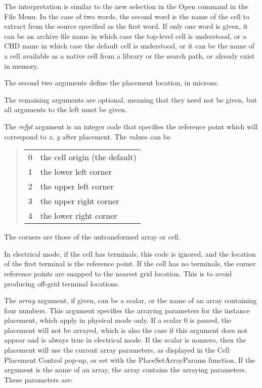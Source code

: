 \begin{description}
The interpretation is similar to the {\cb new} selection in the {\cb
Open} command in the {\cb File Menu}.  In the case of two words, the
second word is the name of the cell to extract from the source
specified as the first word.  If only one word is given, it can be an
archive file name in which case the top-level cell is understood, or a
CHD name in which case the default cell is understood, or it can be
the name of a cell available as a native cell from a library or the
search path, or already exist in memory.

The second two arguments define the placement location, in microns.

The remaining arguments are optional, meaning that they need not
be given, but all arguments to the left must be given.
       
The {\it refpt} argument is an integer code that specifies the
reference point which will correspond to {\it x\/}, {\it y} after
placement.  The values can be
\begin{quote}
\begin{tabular}{ll}
0 & the cell origin (the default)\\
1 & the lower left corner\\
2 & the upper left corner\\
3 & the upper right corner\\
4 & the lower right corner\\
\end{tabular}
\end{quote}
The corners are those of the untransformed array or cell.
       
In electrical mode, if the cell has terminals, this code is ignored,
and the location of the first terminal is the reference point.  If the
cell has no terminals, the corner reference points are snapped to the
nearest grid location.  This is to avoid producing off-grid terminal
locations.

The {\it array} argument, if given, can be a scalar, or the name of an
array containing four numbers.  This argument specifies the arraying
parameters for the instance placement, which apply in physical mode
only.  If a scalar 0 is passed, the placement will not be arrayed,
which is also the case if this argument does not appear and is always
true in electrical mode.  If the scalar is nonzero, then the placement
will use the current array parameters, as displayed in the {\cb Cell
Placement Control} pop-up, or set with the {\vt PlaceSetArrayParams}
function.  If the argument is the name of an array, the array contains
the arraying parameters.  These parameters are:


\end{description}
